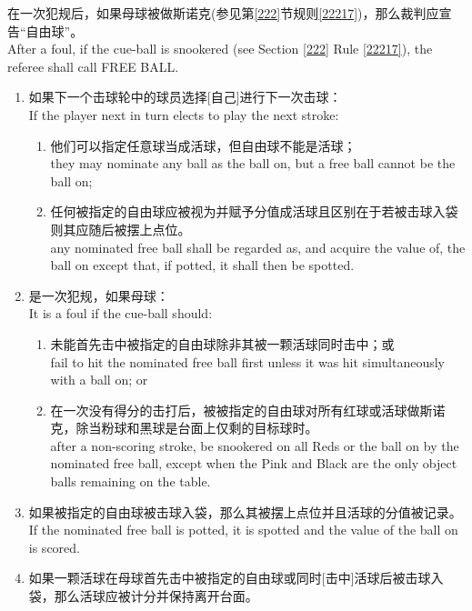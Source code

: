 \noindent 在一次犯规后，如果母球被做斯诺克(参见第\ref{222}节规则\ref{22217})，那么裁判应宣告``自由球''。\\
After a foul, if the cue-ball is snookered (see Section \ref{222} Rule \ref{22217}), the referee shall call FREE BALL.
\begin{enumerate}[label=(\alph*)]
    \item 如果下一个击球轮中的球员选择[自己]进行下一次击球：\\
    If the player next in turn elects to play the next stroke:
    \begin{enumerate}[label=(\roman*)]
        \item 他们可以指定任意球当成活球，但自由球不能是活球；\\
        they may nominate any ball as the ball on, but a free ball cannot be the ball on;
        \item 任何被指定的自由球应被视为并赋予分值成活球且区别在于若被击球入袋则其应随后被摆上点位。\\
        any nominated free ball shall be regarded as, and acquire the value of, the ball on except that, if potted, it shall then be spotted.
    \end{enumerate}
    \item \label{22312b}是一次犯规，如果母球：\\
    It is a foul if the cue-ball should:
    \begin{enumerate}[label=(\roman*)]
        \item 未能首先击中被指定的自由球除非其被一颗活球同时击中；或\\
        fail to hit the nominated free ball first unless it was hit simultaneously with a ball on; or
        \item \label{22312bii}在一次没有得分的击打后，被被指定的自由球对所有红球或活球做斯诺克，除当粉球和黑球是台面上仅剩的目标球时。\\
        after a non-scoring stroke, be snookered on all Reds or the ball on by the nominated free ball, except when the Pink and Black are the only object balls remaining on the table.
    \end{enumerate}
    \item 如果被指定的自由球被击球入袋，那么其被摆上点位并且活球的分值被记录。\\
    If the nominated free ball is potted, it is spotted and the value of the ball on is scored.
    \item 如果一颗活球在母球首先击中被指定的自由球或同时[击中]活球后被击球入袋，那么活球应被计分并保持离开台面。\\

\end{enumerate}

